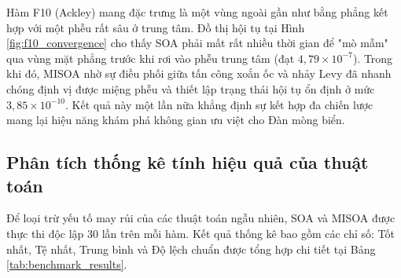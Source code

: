 \documentclass[12pt, a4paper]{article}
\begin{document}
Hàm F10 (Ackley) mang đặc trưng là một vùng ngoài gần như bằng phẳng kết hợp với một phễu rất sâu ở trung tâm. Đồ thị hội tụ tại Hình \ref{fig:f10_convergence} cho thấy SOA phải mất rất nhiều thời gian để "mò mẫm" qua vùng mặt phẳng trước khi rơi vào phễu trung tâm (đạt $4,79 \times 10^{-7}$). Trong khi đó, MISOA nhờ sự điều phối giữa tấn công xoắn ốc và nhảy Levy đã nhanh chóng định vị được miệng phễu và thiết lập trạng thái hội tụ ổn định ở mức $3,85 \times 10^{-10}$. Kết quả này một lần nữa khẳng định sự kết hợp đa chiến lược mang lại hiệu năng khám phá không gian ưu việt cho Đàn mòng biển.

\subsection{Phân tích thống kê tính hiệu quả của thuật toán}
Để loại trừ yếu tố may rủi của các thuật toán ngẫu nhiên, SOA và MISOA được thực thi độc lập 30 lần trên mỗi hàm. Kết quả thống kê bao gồm các chỉ số: Tốt nhất, Tệ nhất, Trung bình và Độ lệch chuẩn được tổng hợp chi tiết tại Bảng \ref{tab:benchmark_results}.

\begin{table}[H]
\centering
\caption{Kết quả thống kê Benchmark trên 4 hàm tiêu chuẩn (30 lần chạy, 500 vòng lặp)}
\label{tab:benchmark_results}
\end{table}
\end{document}
